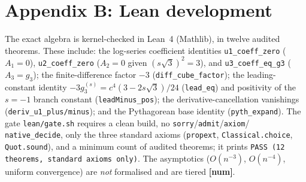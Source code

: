 \documentclass[11pt]{article}
\theoremstyle{plain}
\theoremstyle{definition}
\theoremstyle{remark}
\begin{document}
\section*{Appendix B: Lean development}
\label{app:lean}
The exact algebra is kernel-checked in Lean~4 (Mathlib), in twelve audited
theorems. These include: the log-series coefficient identities
\texttt{u1\_coeff\_zero} ($A_1=0$), \texttt{u2\_coeff\_zero} ($A_2=0$ given
$(s\sqrt3)^2=3$), and \texttt{u3\_coeff\_eq\_g3} ($A_3=g_3$); the
finite-difference factor $-3$ (\texttt{diff\_cube\_factor}); the
leading-constant identity $-3g_3^{(s)} = c^4(3-2s\sqrt3)/24$ (\texttt{lead\_eq})
and positivity of the $s=-1$ branch constant (\texttt{leadMinus\_pos}); the
derivative-cancellation vanishings (\texttt{deriv\_u1\_plus/minus}); and the
Pythagorean base identity (\texttt{pyth\_expand}). The gate \texttt{lean/gate.sh}
requires a clean build, no \texttt{sorry}/\texttt{admit}/\texttt{axiom}/
\texttt{native\_decide}, only the three standard axioms (\texttt{propext},
\texttt{Classical.choice}, \texttt{Quot.sound}), and a minimum count of audited
theorems; it prints \texttt{PASS (12 theorems, standard axioms only)}. The
asymptotics ($O(n^{-3})$, $O(n^{-4})$, uniform convergence) are \emph{not}
formalised and are tiered \textbf{[num]}.
\end{document}
